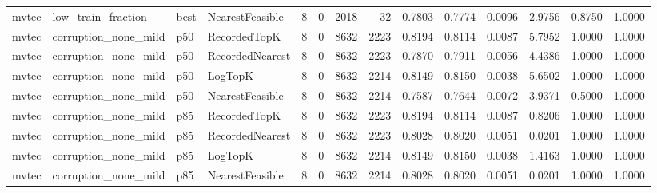 \begin{tabular}{llllrrrrrrrrrr}
   mvtec &   low\_train\_fraction &   best & NearestFeasible &           8 &          0 &           2018 &                  32 &         0.7803 &          0.7774 &                    0.0096 &         2.9756 &                 0.8750 &                  1.0000 \\
   mvtec & corruption\_none\_mild &    p50 &    RecordedTopK &           8 &          0 &           8632 &                2223 &         0.8194 &          0.8114 &                    0.0087 &         5.7952 &                 1.0000 &                  1.0000 \\
   mvtec & corruption\_none\_mild &    p50 & RecordedNearest &           8 &          0 &           8632 &                2223 &         0.7870 &          0.7911 &                    0.0056 &         4.4386 &                 1.0000 &                  1.0000 \\
   mvtec & corruption\_none\_mild &    p50 &         LogTopK &           8 &          0 &           8632 &                2214 &         0.8149 &          0.8150 &                    0.0038 &         5.6502 &                 1.0000 &                  1.0000 \\
   mvtec & corruption\_none\_mild &    p50 & NearestFeasible &           8 &          0 &           8632 &                2214 &         0.7587 &          0.7644 &                    0.0072 &         3.9371 &                 0.5000 &                  1.0000 \\
   mvtec & corruption\_none\_mild &    p85 &    RecordedTopK &           8 &          0 &           8632 &                2223 &         0.8194 &          0.8114 &                    0.0087 &         0.8206 &                 1.0000 &                  1.0000 \\
   mvtec & corruption\_none\_mild &    p85 & RecordedNearest &           8 &          0 &           8632 &                2223 &         0.8028 &          0.8020 &                    0.0051 &         0.0201 &                 1.0000 &                  1.0000 \\
   mvtec & corruption\_none\_mild &    p85 &         LogTopK &           8 &          0 &           8632 &                2214 &         0.8149 &          0.8150 &                    0.0038 &         1.4163 &                 1.0000 &                  1.0000 \\
   mvtec & corruption\_none\_mild &    p85 & NearestFeasible &           8 &          0 &           8632 &                2214 &         0.8028 &          0.8020 &                    0.0051 &         0.0201 &                 1.0000 &                  1.0000 \\

\end{tabular}
